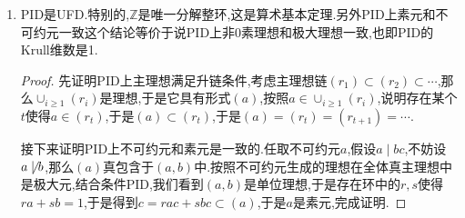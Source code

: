 \begin{enumerate}
\begin{proof}
    	(a):诺特整环$S^{-1}A$的高度1素理想具有形式$S^{-1}\mathfrak{p}$,其中$\mathfrak{p}$是$A$的高度1素理想,按照$A$是UFD得到$\mathfrak{p}$是主理想,于是$S^{-1}\mathfrak{p}$也是主理想.于是$S^{-1}A$是UFD.
    	
    	\qquad
    	
    	(b):设$\mathfrak{p}$是$A$的高度1素理想,只需证明它是主理想.如果$\mathfrak{p}\cap S$非空,按照素理想定义有$\mathfrak{p}$包含了某个$\Gamma$中的元$\pi$,所以$\mathfrak{p}$包含了非零素理想$\pi A$,但是$\mathfrak{p}$的高度1,迫使$\mathfrak{p}=\pi A$.如果$\mathfrak{p}\cap S$是空集,那么$S^{-1}\mathfrak{p}$是$S^{-1}A$的高度1素理想,所以是主理想,可记$S^{-1}\mathfrak{p}=aS^{-1}A$,其中$a\in A\cap S^{-1}\mathfrak{p}=\mathfrak{p}$.把$a$取为所有满足这个等式的$a$生成的主理想中的极大元.那么$a$不被$\Gamma$中的素元整除.最后如果$x\in\mathfrak{p}$,记$x/1=ay/s$,其中$s\in S,y\in A$,那么$xs=ay$,但是$a$的唯一分解中不含$\Gamma$中的素元,而$s$的唯一分解中只含$\Gamma$中的素元,所以$y\in sA$,于是$x\in aA$,也即$\mathfrak{p}=aA$.
    \end{proof}
    \item PID是UFD.特别的,$\mathbb{Z}$是唯一分解整环,这是算术基本定理.另外PID上素元和不可约元一致这个结论等价于说PID上非0素理想和极大理想一致,也即PID的Krull维数是1.
    \begin{proof}
    	
    	先证明PID上主理想满足升链条件,考虑主理想链$(r_1)\subset (r_2)\subset\cdots$,那么$\cup_{i\ge1}(r_i)$是理想,于是它具有形式$(a)$,按照$a\in\cup_{i\ge1}(r_i)$,说明存在某个$t$使得$a\in (r_t)$,于是$(a)\subset (r_t)$,于是$(a)=(r_t)=(r_{t+1})=\cdots$.
    	
    	接下来证明PID上不可约元和素元是一致的.任取不可约元$a$,假设$a\mid bc$,不妨设$a\not\mid b$,那么$(a)$真包含于$(a,b)$中.按照不可约元生成的理想在全体真主理想中是极大元,结合条件PID,我们看到$(a,b)$是单位理想,于是存在环中的$r,s$使得$ra+sb=1$,于是得到$c=rac+sbc\subset (a)$,于是$a$是素元,完成证明.
    \end{proof}
\end{enumerate}

